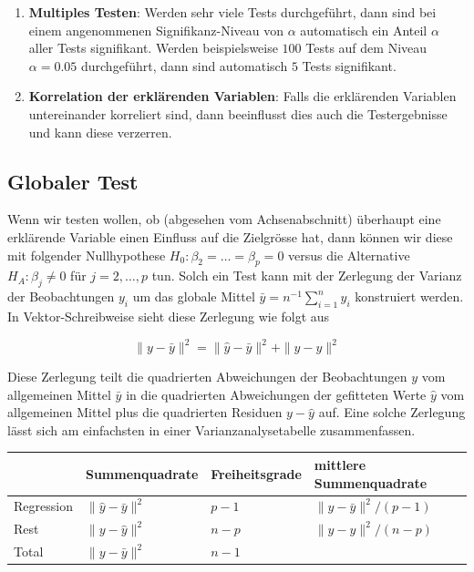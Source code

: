 \documentclass[]{book}
\providecommand{\tightlist}{%
  \setlength{\itemsep}{0pt}\setlength{\parskip}{0pt}}
\begin{document}
\begin{enumerate}
\def\labelenumi{\arabic{enumi}.}
\tightlist
\item
  \textbf{Multiples Testen}: Werden sehr viele Tests durchgeführt, dann
  sind bei einem angenommenen Signifikanz-Niveau von \(\alpha\)
  automatisch ein Anteil \(\alpha\) aller Tests signifikant. Werden
  beispielsweise \(100\) Tests auf dem Niveau \(\alpha = 0.05\)
  durchgeführt, dann sind automatisch \(5\) Tests signifikant.
\item
  \textbf{Korrelation der erklärenden Variablen}: Falls die erklärenden
  Variablen untereinander korreliert sind, dann beeinflusst dies auch
  die Testergebnisse und kann diese verzerren.
\end{enumerate}

\subsection{Globaler Test}\label{globaler-test}

Wenn wir testen wollen, ob (abgesehen vom Achsenabschnitt) überhaupt
eine erklärende Variable einen Einfluss auf die Zielgrösse hat, dann
können wir diese mit folgender Nullhypothese
\(H_0: \beta_2 = \ldots = \beta_p = 0\) versus die Alternative
\(H_A: \beta_j \ne 0\) für \(j=2,\ldots, p\) tun. Solch ein Test kann
mit der Zerlegung der Varianz der Beobachtungen \(y_i\) um das globale
Mittel \(\bar{y} = n^{-1}\sum_{i=1}^ny_i\) konstruiert werden. In
Vektor-Schreibweise sieht diese Zerlegung wie folgt aus

\begin{equation}\|y - \bar{y}\|^2 = \|\hat{y} - \bar{y}\|^2 + \|y - \hat{y}\|^2\end{equation}

Diese Zerlegung teilt die quadrierten Abweichungen der Beobachtungen
\(y\) vom allgemeinen Mittel \(\bar{y}\) in die quadrierten Abweichungen
der gefitteten Werte \(\hat{y}\) vom allgemeinen Mittel plus die
quadrierten Residuen \(y-\hat{y}\) auf. Eine solche Zerlegung lässt sich
am einfachsten in einer Varianzanalysetabelle zusammenfassen.

\begin{center}

\begin{tabular}{llll}
\hline
            &   Summenquadrate             &  Freiheitsgrade &  mittlere Summenquadrate          \\
\hline
Regression  &   $\|\hat{y} - \bar{y}\|^2$  &  $p-1$          &  $\|\hat{y} - \bar{y}\|^2/(p-1)$  \\
Rest        &   $\|y - \hat{y}\|^2$        &  $n-p$          &  $\|y - \hat{y}\|^2/(n-p)$        \\
\hline
Total       &   $\|y - \bar{y}\|^2$        &  $n-1$          &
\end{tabular}
\end{center}
\end{document}
